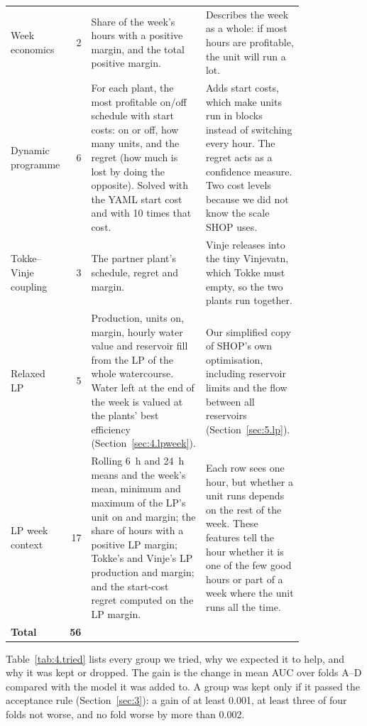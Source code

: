 \begin{table}[H]
\begin{tabular}{>{\raggedright\arraybackslash}p{0.15\linewidth}r>{\raggedright\arraybackslash}p{0.32\linewidth}>{\raggedright\arraybackslash}p{0.35\linewidth}}
    Week economics & 2 & Share of the week's hours with a positive margin, and the total positive margin. & Describes the week as a whole: if most hours are profitable, the unit will run a lot. \\
    Dynamic programme & 6 & For each plant, the most profitable on/off schedule with start costs: on or off, how many units, and the regret (how much is lost by doing the opposite). Solved with the YAML start cost and with 10 times that cost. & Adds start costs, which make units run in blocks instead of switching every hour. The regret acts as a confidence measure. Two cost levels because we did not know the scale SHOP uses. \\
    Tokke--Vinje coupling & 3 & The partner plant's schedule, regret and margin. & Vinje releases into the tiny Vinjevatn, which Tokke must empty, so the two plants run together. \\
    Relaxed LP & 5 & Production, units on, margin, hourly water value and reservoir fill from the LP of the whole watercourse. Water left at the end of the week is valued at the plants' best efficiency (Section~\ref{sec:4.lpweek}). & Our simplified copy of SHOP's own optimisation, including reservoir limits and the flow between all reservoirs (Section~\ref{sec:5.lp}). \\
    LP week context & 17 & Rolling 6~h and 24~h means and the week's mean, minimum and maximum of the LP's unit on and margin; the share of hours with a positive LP margin; Tokke's and Vinje's LP production and margin; and the start-cost regret computed on the LP margin. & Each row sees one hour, but whether a unit runs depends on the rest of the week. These features tell the hour whether it is one of the few good hours or part of a week where the unit runs all the time. \\
    \midrule
    \textbf{Total} & \textbf{56} & & \\
    \bottomrule
  \end{tabular}
\end{table}

Table~\ref{tab:4.tried} lists every group we tried, why we expected it to help, and why it was kept or dropped. The gain is the change in mean AUC over folds A--D compared with the model it was added to. A group was kept only if it passed the acceptance rule (Section~\ref{sec:3}): a gain of at least 0.001, at least three of four folds not worse, and no fold worse by more than 0.002.

